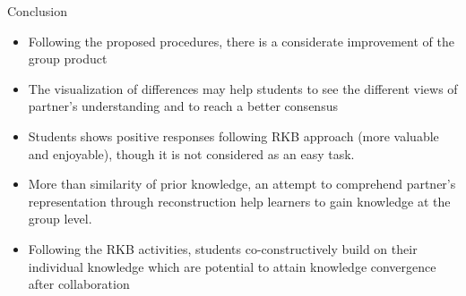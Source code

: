 \begin{frame}{Conclusion}
    \begin{itemize}
        \item Following the proposed procedures, 
        there is a considerate improvement of the group product 
        \item The visualization of differences may help students to
        see the different views of partner’s understanding and to reach a better consensus
        \item Students shows positive responses following RKB approach (more valuable and enjoyable),  though it is not considered as an easy task. 
        \item More than similarity of prior knowledge, an attempt to comprehend partner’s representation through reconstruction help learners to gain knowledge at the group level.
        \item Following the RKB activities, students co-constructively build on their individual knowledge which are potential to attain knowledge convergence after collaboration


    \end{itemize}    
\end{frame}